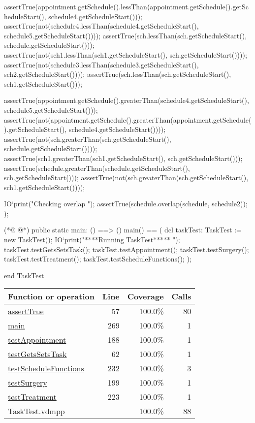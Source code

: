\begin{vdmpp}[breaklines=true]
   assertTrue(appointment.getSchedule().lessThan(appointment.getSchedule().getScheduleStart(), schedule4.getScheduleStart()));
   assertTrue(not(schedule4.lessThan(schedule4.getScheduleStart(), schedule5.getScheduleStart())));
   assertTrue(sch.lessThan(sch.getScheduleStart(), schedule.getScheduleStart()));
   assertTrue(not(sch1.lessThan(sch1.getScheduleStart(), sch.getScheduleStart())));
   assertTrue(not(schedule3.lessThan(schedule3.getScheduleStart(), sch2.getScheduleStart())));
   assertTrue(sch.lessThan(sch.getScheduleStart(), sch1.getScheduleStart()));
   
   assertTrue(appointment.getSchedule().greaterThan(schedule4.getScheduleStart(), schedule5.getScheduleStart()));
   assertTrue(not(appointment.getSchedule().greaterThan(appointment.getSchedule().getScheduleStart(), schedule4.getScheduleStart())));
   assertTrue(not(sch.greaterThan(sch.getScheduleStart(), schedule.getScheduleStart())));
   assertTrue(sch1.greaterThan(sch1.getScheduleStart(), sch.getScheduleStart()));
   assertTrue(schedule.greaterThan(schedule.getScheduleStart(), sch.getScheduleStart()));
   assertTrue(not(sch.greaterThan(sch.getScheduleStart(), sch1.getScheduleStart())));
   
   IO`print("\n Checking overlap \n");
   assertTrue(schedule.overlap(schedule, schedule2));
  );
  
(*@
\label{main:269}
@*)
  public static main: () ==> ()
   main() == (
    dcl taskTest: TaskTest := new TaskTest();
    IO`print("\n\n *****Running TaskTest***** \n");
    taskTest.testGetsSetsTask();
    taskTest.testAppointment();
    taskTest.testSurgery();
    taskTest.testTreatment();
    taskTest.testScheduleFunctions();
   );

end TaskTest
\end{vdmpp}
\bigskip
\begin{longtable}{|l|r|r|r|}
\hline
Function or operation & Line & Coverage & Calls \\
\hline
\hline
\hyperref[assertTrue:57]{assertTrue} & 57&100.0\% & 80 \\
\hline
\hyperref[main:269]{main} & 269&100.0\% & 1 \\
\hline
\hyperref[testAppointment:188]{testAppointment} & 188&100.0\% & 1 \\
\hline
\hyperref[testGetsSetsTask:62]{testGetsSetsTask} & 62&100.0\% & 1 \\
\hline
\hyperref[testScheduleFunctions:232]{testScheduleFunctions} & 232&100.0\% & 3 \\
\hline
\hyperref[testSurgery:199]{testSurgery} & 199&100.0\% & 1 \\
\hline
\hyperref[testTreatment:223]{testTreatment} & 223&100.0\% & 1 \\
\hline
\hline
TaskTest.vdmpp & & 100.0\% & 88 \\
\hline
\end{longtable}

